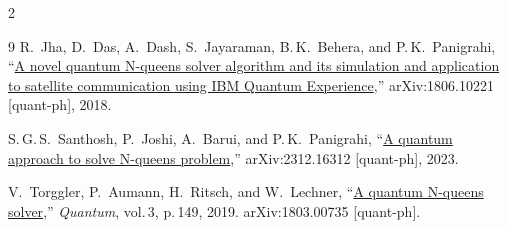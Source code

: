 \documentclass[9pt, a4paper]{extarticle}
\begin{document}
\begin{multicols}{2}
\begin{thebibliography}{9}
    R.~Jha, D.~Das, A.~Dash, S.~Jayaraman, B.\,K.~Behera, and P.\,K.~Panigrahi,
    ``\href{https://arxiv.org/abs/1806.10221}{A novel quantum N-queens solver algorithm and its simulation
    and application to satellite communication using IBM Quantum Experience},''
    arXiv:1806.10221 [quant-ph], 2018.

    S.\,G.\,S.~Santhosh, P.~Joshi, A.~Barui, and P.\,K.~Panigrahi,
    ``\href{https://arxiv.org/abs/2312.16312}{A quantum approach to solve N-queens problem},''
    arXiv:2312.16312 [quant-ph], 2023.

    V.~Torggler, P.~Aumann, H.~Ritsch, and W.~Lechner,
    ``\href{https://doi.org/10.22331/q-2019-06-03-149}{A quantum N-queens solver},''
    \textit{Quantum}, vol.\,3, p.\,149, 2019.
    arXiv:1803.00735 [quant-ph].
\end{thebibliography}

\end{multicols}
\end{document}
